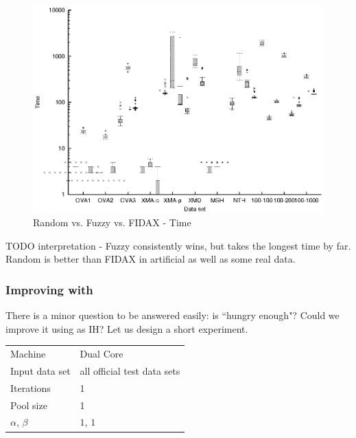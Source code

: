 \begin{figure}
  \caption{Random vs. Fuzzy vs. FIDAX - Time}
  \label{image-experiment-random-fuzzy-fidax-time}
  \centering
    \includegraphics[width=\textwidth]{images/experiments/random-fuzzy-fidax-time}
\end{figure}

TODO interpretation - Fuzzy consistently wins, but takes the longest time by far. Random is better than FIDAX in artificial as well as some real data.

\subsubsection{Improving  with }


There is a minor question to be answered easily: is  ``hungry enough"? Could we improve it using  as IH? Let us design a short experiment.

\begin{center}
\bigskip
\begin{tabular}{| l | l |}
  \hline
  \hline
  Machine           & Dual Core \\
  Input data set    & all official test data sets \\
  Iterations        & 1 \\
  Pool size         & 1 \\
  $\alpha$, $\beta$ & $1$, $1$ \\
  \hline
\end{tabular}
\bigskip
\end{center}

